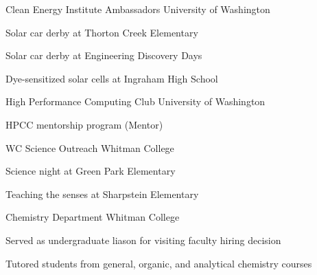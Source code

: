 


\begin{cventries}

\cventry
  {}
  {Clean Energy Institute Ambassadors} %
  {University of Washington} %
  {}
  {
    \begin{cvitems}
      \item{Solar car derby at Thorton Creek Elementary}
      \item{Solar car derby at Engineering Discovery Days}
      \item{Dye-sensitized solar cells at Ingraham High School}
    \end{cvitems}
  }

\cventry
  {}
  {High Performance Computing Club} %
  {University of Washington} %
  {}
  {
    \begin{cvitems}
      \item{HPCC mentorship program (Mentor)}
    \end{cvitems}
  }
   
\cventry
  {}
  {WC Science Outreach} %
  {Whitman College} %
  {}
  {
    \begin{cvitems}
      \item{Science night at Green Park Elementary}
      \item{Teaching the senses at Sharpstein Elementary}
    \end{cvitems}
  }

\cventry
  {}
  {Chemistry Department} %
  {Whitman College} %
  {}
  {
    \begin{cvitems}
      \item{Served as undergraduate liason for visiting faculty hiring decision}
      \item{Tutored students from general, organic, and analytical chemistry courses}
    \end{cvitems}
  }

\end{cventries}
